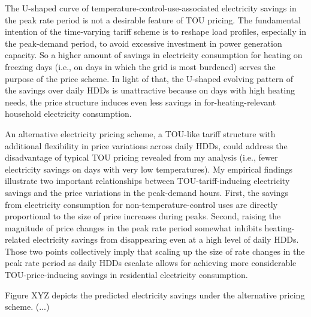 The U-shaped curve of temperature-control-use-associated electricity savings in the peak rate period is not a desirable feature of TOU pricing. The fundamental intention of the time-varying tariff scheme is to reshape load profiles, especially in the peak-demand period, to avoid excessive investment in power generation capacity. So a higher amount of savings in electricity consumption for heating on freezing days (i.e., on days in which the grid is most burdened) serves the purpose of the price scheme. In light of that, the U-shaped evolving pattern of the savings over daily HDDs is unattractive because on days with high heating needs, the price structure induces even less savings in for-heating-relevant household electricity consumption. 

An alternative electricity pricing scheme, a TOU-like tariff structure with additional flexibility in price variations across daily HDDs, could address the disadvantage of typical TOU pricing revealed from my analysis (i.e., fewer electricity savings on days with very low temperatures). My empirical findings illustrate two important relationships between TOU-tariff-inducing electricity savings and the price variations in the peak-demand hours. First, the savings from electricity consumption for non-temperature-control uses are directly proportional to the size of price increases during peaks. Second, raising the magnitude of price changes in the peak rate period somewhat inhibits heating-related electricity savings from disappearing even at a high level of daily HDDs. Those two points collectively imply that scaling up the size of rate changes in the peak rate period as daily HDDs escalate allows for achieving more considerable TOU-price-inducing savings in residential electricity consumption.  
 
Figure XYZ depicts the predicted electricity savings under the alternative pricing scheme. (...) 
